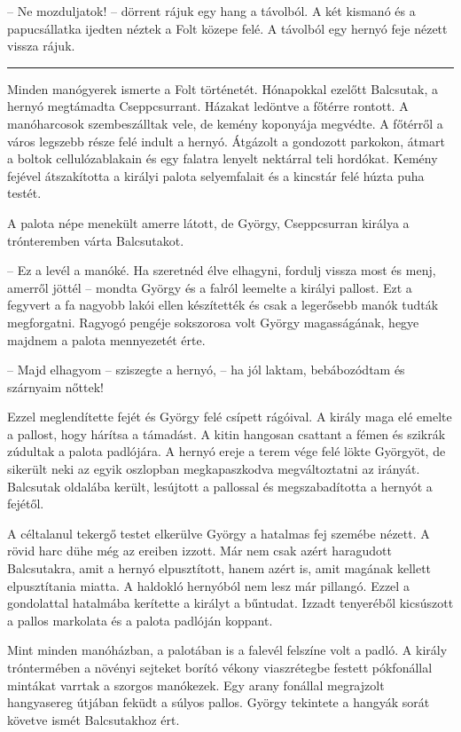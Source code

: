 \documentclass[10pt]{memoir}
\renewcommand{\pfbreakdisplay}{\bigskip \ding{166} \bigskip}
\newcommand{\secbreak}{\fancybreak{\pfbreakdisplay}\indent}
\begin{document}
-- Ne mozduljatok! -- dörrent rájuk egy hang a távolból. A két kismanó és a
papucsállatka ijedten néztek a Folt közepe felé. A távolból egy hernyó feje
nézett vissza rájuk.

\secbreak

Minden manógyerek ismerte a Folt történetét. Hónapokkal ezelőtt Balcsutak, a
hernyó megtámadta Cseppcsurrant. Házakat ledöntve a főtérre rontott. A
manóharcosok szembeszálltak vele, de kemény koponyája megvédte. A főtérről a
város legszebb része felé indult a hernyó. Átgázolt a gondozott parkokon,
átmart a boltok cellulózablakain és egy falatra lenyelt nektárral teli
hordókat. Kemény fejével átszakította a királyi palota selyemfalait és a
kincstár felé húzta puha testét.

A palota népe menekült amerre látott, de György, Cseppcsurran királya a
trónteremben várta Balcsutakot.

-- Ez a levél a manóké. Ha szeretnéd élve elhagyni, fordulj vissza most és
menj, amerről jöttél -- mondta György és a falról leemelte a királyi pallost.
Ezt a fegyvert a fa nagyobb lakói ellen készítették és csak a legerősebb manók
tudták megforgatni. Ragyogó pengéje sokszorosa volt György magasságának, hegye
majdnem a palota mennyezetét érte.

-- Majd elhagyom -- sziszegte a hernyó, -- ha jól laktam, bebábozódtam és
szárnyaim nőttek!

Ezzel meglendítette fejét és György felé csípett rágóival. A király maga elé
emelte a pallost, hogy hárítsa a támadást. A kitin hangosan csattant a fémen és
szikrák zúdultak a palota padlójára. A hernyó ereje a terem vége felé lökte
Györgyöt, de sikerült neki az egyik oszlopban megkapaszkodva megváltoztatni az
irányát. Balcsutak oldalába került, lesújtott a pallossal és megszabadította a
hernyót a fejétől.

A céltalanul tekergő testet elkerülve György a hatalmas fej szemébe nézett. A
rövid harc dühe még az ereiben izzott. Már nem csak azért haragudott
Balcsutakra, amit a hernyó elpusztított, hanem azért is, amit magának kellett
elpusztítania miatta. A haldokló hernyóból nem lesz már pillangó. Ezzel a
gondolattal hatalmába kerítette a királyt a bűntudat. Izzadt tenyeréből
kicsúszott a pallos markolata és a palota padlóján koppant.

Mint minden manóházban, a palotában is a falevél felszíne volt a padló. A
király tróntermében a növényi sejteket borító vékony viaszrétegbe festett
pókfonállal mintákat varrtak a szorgos manókezek. Egy arany fonállal megrajzolt
hangyasereg útjában feküdt a súlyos pallos. György tekintete a hangyák sorát
követve ismét Balcsutakhoz ért.
\end{document}
